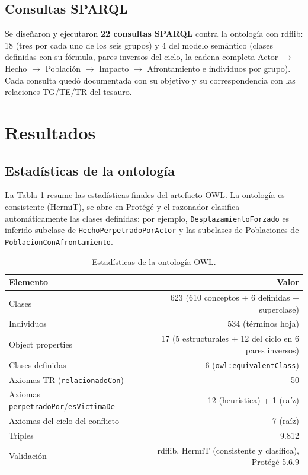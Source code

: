 \documentclass[11pt]{tg_usta}
\begin{document}
\subsection{Consultas SPARQL}

Se diseñaron y ejecutaron \textbf{22 consultas SPARQL} contra la ontología con rdflib: 18 (tres por cada uno de los seis grupos) y 4 del modelo semántico (clases definidas con su fórmula, pares inversos del ciclo, la cadena completa Actor $\rightarrow$ Hecho $\rightarrow$ Población $\rightarrow$ Impacto $\rightarrow$ Afrontamiento e individuos por grupo). Cada consulta quedó documentada con su objetivo y su correspondencia con las relaciones TG/TE/TR del tesauro.


\section{Resultados}

\subsection{Estadísticas de la ontología}

La Tabla \ref{tab:ontologia} resume las estadísticas finales del artefacto OWL. La ontología es consistente (HermiT), se abre en Protégé y el razonador clasifica automáticamente las clases definidas: por ejemplo, \texttt{DesplazamientoForzado} es inferido subclase de \texttt{HechoPerpetradoPorActor} y las subclases de Poblaciones de \texttt{PoblacionConAfrontamiento}.

\begin{table}[H]
    \centering
    \caption{Estadísticas de la ontología OWL.}
    \small
    \setlength{\tabcolsep}{4pt}
    \begin{tabular}{l r}
    \hline
    Elemento & Valor \\
    \hline
    Clases & 623 (610 conceptos + 6 definidas + superclase) \\
    Individuos & 534 (términos hoja) \\
    Object properties & 17 (5 estructurales + 12 del ciclo en 6 pares inversos) \\
    Clases definidas & 6 (\texttt{owl:equivalentClass}) \\
    Axiomas TR (\texttt{relacionadoCon}) & 50 \\
    Axiomas \texttt{perpetradoPor}/\texttt{esVictimaDe} & 12 (heurística) + 1 (raíz) \\
    Axiomas del ciclo del conflicto & 7 (raíz) \\
    Triples & 9.812 \\
    Validación & rdflib, HermiT (consistente y clasifica), Protégé 5.6.9 \\
    \hline
    \end{tabular}
    \label{tab:ontologia}
\end{table}
\end{document}
